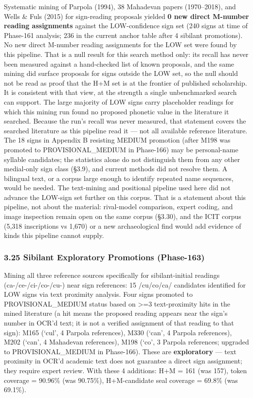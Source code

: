 \documentclass[
]{article}
\begin{document}
Systematic mining of Parpola (1994), 38 Mahadevan papers (1970--2018),
and Wells \& Fuls (2015) for sign-reading proposals yielded \textbf{0 new direct
M-number reading assignments} against the LOW-confidence sign set (240 signs at time of Phase-161 analysis; 236 in the current anchor table after 4 sibilant promotions). No new direct M-number reading assignments for the LOW set were found by this pipeline. That is a null result for this search method only: its recall has never been measured against a hand-checked list of known proposals, and the same mining did surface proposals for signs outside the LOW set, so the null should not be read as proof that the H+M set is at the frontier of published scholarship. It is consistent with that view, at the strength a single unbenchmarked search can support. The large majority of LOW signs carry placeholder readings for which this mining run found no proposed phonetic value in the literature it searched. Because the run's recall was never measured, that statement covers the searched literature as this pipeline read it --- not all available reference literature. The 18 signs in Appendix B resisting MEDIUM promotion (after M198 was promoted to PROVISIONAL\_MEDIUM in Phase-166) may be personal-name syllable candidates; the statistics alone do not distinguish them from any other medial-only sign class (§3.9), and current methods did not resolve them. A bilingual text, or a corpus large enough to identify repeated name sequences, would be needed.
The text-mining and positional pipeline used here did not advance the LOW-sign set further on this corpus. That is a statement about this pipeline, not about the material: rival-model comparison, expert coding, and image inspection remain open on the same corpus (§3.30), and the ICIT corpus (5,318 inscriptions vs 1,670) or a new archaeological find would add evidence of kinds this pipeline cannot supply.

\subsubsection{3.25 Sibilant Exploratory Promotions
(Phase-163)}\label{sibilant-exploratory-promotions-phase-163}

Mining all three reference sources specifically for sibilant-initial
readings (ca-/ce-/ci-/co-/cu-) near sign references: 15 /cu/co/ca/
candidates identified for LOW signs via text proximity analysis. Four signs promoted to PROVISIONAL\_MEDIUM status based on \textgreater{}=3 text-proximity hits in the mined literature (a hit means the proposed reading appears near the sign's number in OCR'd text; it is not a verified assignment of that reading to that sign): M165 (`cul', 4 Parpola references), M330 (`can', 4 Parpola
references), M202 (`can', 4 Mahadevan references), M198 (`co', 3 Parpola references;
upgraded to PROVISIONAL\_MEDIUM in Phase-166). These are \textbf{exploratory} --- text proximity
in OCR'd academic text does not guarantee a direct sign assignment; they
require expert review. With these 4 additions: H+M = 161 (was 157),
token coverage = 90.96\% (was 90.75\%), H+M-candidate seal coverage = 69.8\% (was 69.1\%).
\end{document}
